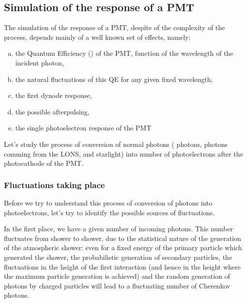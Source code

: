 \subsection{Simulation of the response of a PMT}

The simulation of the response of a PMT, despite of the complexity of the
process, depends mainly of a well known set of effects, namely:

\begin{enumerate}[a.]
\item the Quantum Efficiency (\QE) of the PMT, function of the
  wavelength of the incident photon,
  
\item the natural fluctuations of this QE for any given fixed
  wavelength,

\item the first dynode response, 

\item the possible afterpulsing, 

\item the single photoelectron response of the PMT
\end{enumerate}

Let's study the process of conversion of normal photons (\Cherenkov
photons, photons comming from the LONS, and starlight) into number of
photoelectrons after the photocathode of the PMT.

\subsubsection{Fluctuations taking place}

Before we try to understand this process of conversion of \Cherenkov
photons into photoelectrons, let's try to identify the possible
sources of fluctuations.

In the first place, we have a given number of incoming \Cherenkov
photons. This number fluctuates from shower to shower, due to the
statistical nature of the generation of the atmospheric shower: even
for a fixed energy of the primary particle which generated the shower,
the probabilistic generation of secondary particles, the fluctuations
in the height of the first interaction (and hence in the height where
the maximum particle generation is achieved) and the random generation
of \Cherenkov photons by charged particles will lead to a fluctuating
number of Cherenkov photons.

